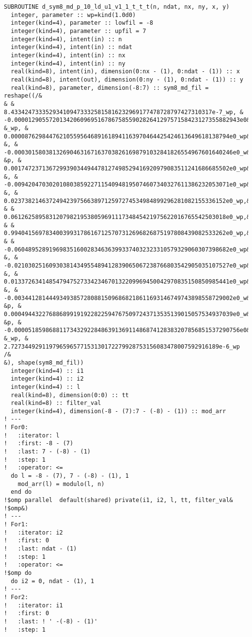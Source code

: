 \begin{lstlisting}[language={[90]Fortran},basicstyle=\footnotesize\sffamily]
SUBROUTINE d_sym8_md_p_10_ld_u1_v1_1_t_t_t(n, ndat, nx, ny, x, y)
  integer, parameter :: wp=kind(1.0d0)
  integer(kind=4), parameter :: lowfil = -8
  integer(kind=4), parameter :: upfil = 7
  integer(kind=4), intent(in) :: n
  integer(kind=4), intent(in) :: ndat
  integer(kind=4), intent(in) :: nx
  integer(kind=4), intent(in) :: ny
  real(kind=8), intent(in), dimension(0:nx - (1), 0:ndat - (1)) :: x
  real(kind=8), intent(out), dimension(0:ny - (1), 0:ndat - (1)) :: y
  real(kind=8), parameter, dimension(-8:7) :: sym8_md_fil = reshape((/&
& &
8.4334247333529341094733325815816232969177478728797427310317e-7_wp, &
-0.00001290557201342060969516786758559028264129757158423127355882943e0&
&_wp, &
0.000087629844762105595646891618941163970464425424613649618138794e0_wp&
&, &
-0.000301580381326904631671637038261698791032841826554967601640246e0_w&
&p, &
0.001747237136729939034494478127498529416920979083511241686685502e0_wp&
&, &
-0.00942047030201080385922711540948195074607340327611386232053071e0_wp&
&, &
0.02373821463724942397566389712597274534984899296281082155336152e0_wp,&
& &
0.06126258958312079821953805969111734845421975622016765542503018e0_wp,&
& &
0.99404156978340039931786167125707312696826875197808439082533262e0_wp,&
& &
-0.06048952891969835160028346363993374032323310579329060307398682e0_wp&
&, &
-0.02103025160930381434955489412839065067238766803542905035107527e0_wp&
&, &
0.013372634148547947527334234670132209969450042970835150850985441e0_wp&
&, &
-0.003441281444934938572808815096868218611693146749743898558729002e0_w&
&p, &
0.0004944322768868991919228225947675097243713535139015057534937039e0_w&
&p, &
-0.00005185986881173432922848639136911486874128383207856851537290756e0&
&_wp, &
2.727344929119796596577153130172279928753156083478007592916189e-6_wp /&
&), shape(sym8_md_fil))
  integer(kind=4) :: i1
  integer(kind=4) :: i2
  integer(kind=4) :: l
  real(kind=8), dimension(0:0) :: tt
  real(kind=8) :: filter_val
  integer(kind=4), dimension(-8 - (7):7 - (-8) - (1)) :: mod_arr
! ---
! For0:
!   :iterator: l
!   :first: -8 - (7)
!   :last: 7 - (-8) - (1)
!   :step: 1
!   :operator: <=
  do l = -8 - (7), 7 - (-8) - (1), 1
    mod_arr(l) = modulo(l, n)
  end do
!$omp parallel  default(shared) private(i1, i2, l, tt, filter_val&
!$omp&)
! ---
! For1:
!   :iterator: i2
!   :first: 0
!   :last: ndat - (1)
!   :step: 1
!   :operator: <=
!$omp do 
  do i2 = 0, ndat - (1), 1
! ---
! For2:
!   :iterator: i1
!   :first: 0
!   :last: ! ' -(-8) - (1)'
!   :step: 1

\end{lstlisting}
